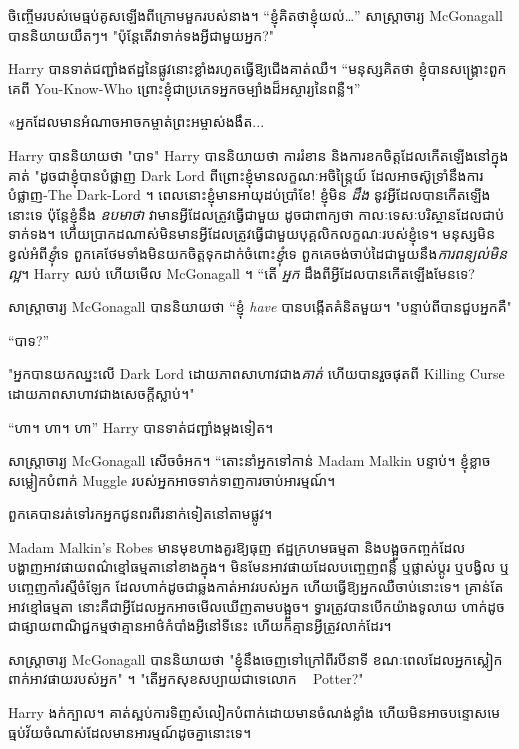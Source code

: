 ចិញ្ចើម​របស់​មេធ្មប់​គូស​ឡើង​ពី​ក្រោម​មួក​របស់​នាង។ “ខ្ញុំគិតថាខ្ញុំយល់…” សាស្ត្រាចារ្យ McGonagall បាននិយាយយឺតៗ។ "ប៉ុន្តែតើវាទាក់ទងអ្វីជាមួយអ្នក?"

Harry បាន​ទាត់​ជញ្ជាំង​ឥដ្ឋ​នៃ​ផ្លូវ​នោះ​ខ្លាំង​រហូត​ធ្វើ​ឱ្យ​ជើង​គាត់​ឈឺ។ “មនុស្សគិតថា ខ្ញុំបានសង្គ្រោះពួកគេពី You-Know-Who ព្រោះខ្ញុំជាប្រភេទអ្នកចម្បាំងដ៏អស្ចារ្យនៃពន្លឺ។”

«អ្នកដែលមានអំណាចអាចកម្ចាត់ព្រះអម្ចាស់ងងឹត...

Harry បាននិយាយថា "បាទ" Harry បាននិយាយថា ការរំខាន និងការខកចិត្តដែលកើតឡើងនៅក្នុងគាត់ "ដូចជាខ្ញុំបានបំផ្លាញ Dark Lord ពីព្រោះខ្ញុំមានលក្ខណៈអចិន្ត្រៃយ៍ ដែលអាចស៊ូទ្រាំនឹងការបំផ្លាញ-The Dark-Lord ។ ពេលនោះខ្ញុំមានអាយុដប់ប្រាំខែ! ខ្ញុំមិន \emph{ដឹង} នូវអ្វីដែលបានកើតឡើងនោះទេ ប៉ុន្តែខ្ញុំនឹង \emph{ឧបមាថា} វាមានអ្វីដែលត្រូវធ្វើជាមួយ ដូចជាពាក្យថា កាលៈទេសៈបរិស្ថានដែលជាប់ទាក់ទង។ ហើយប្រាកដណាស់មិនមានអ្វីដែលត្រូវធ្វើជាមួយបុគ្គលិកលក្ខណៈរបស់ខ្ញុំទេ។ មនុស្សមិនខ្វល់អំពី\emph{ខ្ញុំ}ទេ ពួកគេថែមទាំងមិនយកចិត្តទុកដាក់ចំពោះ\emph{ខ្ញុំ}ទេ ពួកគេចង់ចាប់ដៃជាមួយនឹង\emph{ការពន្យល់មិនល្អ}។ Harry ឈប់ ហើយមើល McGonagall ។ “តើ \emph{អ្នក} ដឹងពីអ្វីដែលបានកើតឡើងមែនទេ?

សាស្រ្តាចារ្យ McGonagall បាននិយាយថា “ខ្ញុំ \emph{ have} បានបង្កើតគំនិតមួយ។ "បន្ទាប់ពីបានជួបអ្នកគឺ"

“បាទ?”

"អ្នកបានយកឈ្នះលើ Dark Lord ដោយភាពសាហាវជាង\emph{គាត់} ហើយបានរួចផុតពី Killing Curse ដោយភាពសាហាវជាងសេចក្ដីស្លាប់។"

“ហា។ ហា។ ហា” Harry បានទាត់ជញ្ជាំងម្តងទៀត។

សាស្រ្តាចារ្យ McGonagall សើចចំអក។ “តោះនាំអ្នកទៅកាន់ Madam Malkin បន្ទាប់។ ខ្ញុំខ្លាចសម្លៀកបំពាក់ Muggle របស់អ្នកអាចទាក់ទាញការចាប់អារម្មណ៍។

ពួកគេបានរត់ទៅរកអ្នកជូនពរពីរនាក់ទៀតនៅតាមផ្លូវ។

Madam Malkin's Robes មានមុខហាងគួរឱ្យធុញ ឥដ្ឋក្រហមធម្មតា និងបង្អួចកញ្ចក់ដែលបង្ហាញអាវផាយពណ៌ខ្មៅធម្មតានៅខាងក្នុង។ មិនមែនអាវផាយដែលបញ្ចេញពន្លឺ ឬផ្លាស់ប្តូរ ឬបង្វិល ឬបញ្ចេញកាំរស្មីចំឡែក ដែលហាក់ដូចជាឆ្លងកាត់អាវរបស់អ្នក ហើយធ្វើឱ្យអ្នកឈឺចាប់នោះទេ។ គ្រាន់​តែ​អាវ​ខ្មៅ​ធម្មតា នោះ​គឺ​ជា​អ្វី​ដែល​អ្នក​អាច​មើល​ឃើញ​តាម​បង្អួច។ ទ្វារ​ត្រូវ​បាន​បើក​យ៉ាង​ទូលាយ ហាក់​ដូច​ជា​ផ្សាយ​ពាណិជ្ជកម្ម​ថា​គ្មាន​អាថ៌កំបាំង​អ្វី​នៅ​ទី​នេះ ហើយ​ក៏​គ្មាន​អ្វី​ត្រូវ​លាក់​ដែរ។

សាស្រ្តាចារ្យ McGonagall បាននិយាយថា "ខ្ញុំនឹងចេញទៅក្រៅពីរបីនាទី ខណៈពេលដែលអ្នកស្លៀកពាក់អាវផាយរបស់អ្នក" ។ "តើអ្នកសុខសប្បាយជាទេលោក ~ Potter?"

Harry ងក់ក្បាល។ គាត់​ស្អប់​ការ​ទិញ​សំលៀកបំពាក់​ដោយ​មាន​ចំណង់​ខ្លាំង ហើយ​មិន​អាច​បន្ទោស​មេធ្មប់​វ័យ​ចំណាស់​ដែល​មាន​អារម្មណ៍​ដូច​គ្នា​នោះ​ទេ។

